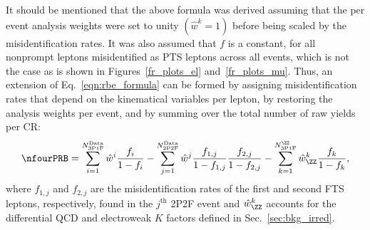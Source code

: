 It should be mentioned that the above formula was derived assuming that the per event analysis weights were set to unity $\left( \hat{w}^k = 1 \right)$ before being scaled by the misidentification rates.
It was also assumed that $f$ is a constant, for all nonprompt leptons misidentified as PTS leptons across all events, which is not the case as is shown in Figures~\ref{fr_plots_el} and~\ref{fr_plots_mu}.
Thus, an extension of Eq.~\ref{eqn:rbe_formula} can be formed by assigning misidentification rates that depend on the kinematical variables per lepton,
by restoring the analysis weights per event,
and by summing over the total number of raw yields per CR:
\begin{equation}
	\label{eqn:rbe_formula_final}
	\nfourPRB =
	  \sum_{i=1}^{N_{\text{3P1F}}^\text{Data}} \hat{w}^i \frac{f_i}{1 - f_i}
	- \sum_{j=1}^{N_{\text{2P2F}}^\text{Data}} \hat{w}^j \frac{f_{1,j}}{1 - f_{1,j}}\frac{f_{2,j}}{1 - f_{2,j}}
	- \sum_{k=1}^{N_{\text{3P1F}}^{\ZZ}} \hat{w}^{k}_{\ZZ} \frac{f_k}{1 - f_k},
\end{equation}
where $f_{1,j}$ and $f_{2,j}$ are the misidentification rates of the first and second FTS leptons, respectively, found in the $j^{\text{th}}$ 2P2F event
and $\hat{w}^k_{\ZZ}$ accounts for the differential QCD and electroweak $K$ factors defined in Sec.~\ref{sec:bkg_irred}.

